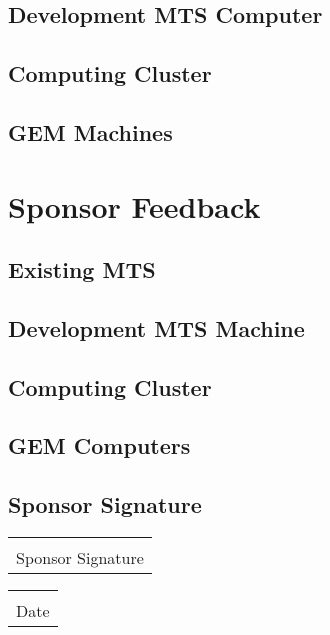 \documentclass[12pt]{article}
\makeatletter
\newcommand{\titledate}[2][2.5in]{%
	\noindent%
	\begin{tabular}{@{}p{#1}@{}}
		\\ \hline \\[-.75\normalbaselineskip]
		#2
	\end{tabular} \hspace{1in}
	\begin{tabular}{@{}p{#1}@{}}
		\\ \hline \\[-.75\normalbaselineskip]
		Date
	\end{tabular}
}
\makeatother
\begin{document}
\subsection{Development MTS Computer}



\subsection{Computing Cluster}



\subsection{GEM Machines}


\section{Sponsor Feedback}

\subsection{Existing MTS}

\vspace{1in}

\subsection{Development MTS Machine}

\vspace{1in}

\subsection{Computing Cluster}

\vspace{1in}

\subsection{GEM Computers}

\vspace{1in}

\newpage

\subsection{Sponsor Signature}
\vspace{.5in}
 \titledate{Sponsor Signature}
 
\end{document}
